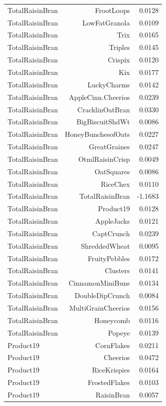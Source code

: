 \begin{longtable}{@{}lrr@{}}
TotalRaisinBran & FrootLoops & 0.0128 \\
TotalRaisinBran & LowFatGranola & 0.0109 \\
TotalRaisinBran & Trix & 0.0165 \\
TotalRaisinBran & Triples & 0.0145 \\
TotalRaisinBran & Crispix & 0.0120 \\
TotalRaisinBran & Kix & 0.0177 \\
TotalRaisinBran & LuckyCharms & 0.0142 \\
TotalRaisinBran & AppleCinn.Cheerios & 0.0239 \\
TotalRaisinBran & CracklinOatBran & 0.0330 \\
TotalRaisinBran & BigBiscuitShdWt & 0.0086 \\
TotalRaisinBran & HoneyBunchesofOats & 0.0227 \\
TotalRaisinBran & GreatGraines & 0.0247 \\
TotalRaisinBran & OtmlRaisinCrisp & 0.0049 \\
TotalRaisinBran & OatSquares & 0.0086 \\
TotalRaisinBran & RiceChex & 0.0110 \\
TotalRaisinBran & TotalRaisinBran & -1.1683 \\
TotalRaisinBran & Product19 & 0.0128 \\
TotalRaisinBran & AppleJacks & 0.0121 \\
TotalRaisinBran & CaptCrunch & 0.0239 \\
TotalRaisinBran & ShreddedWheat & 0.0095 \\
TotalRaisinBran & FruityPebbles & 0.0172 \\
TotalRaisinBran & Clusters & 0.0141 \\
TotalRaisinBran & CinnamonMiniBuns & 0.0134 \\
TotalRaisinBran & DoubleDipCrunch & 0.0084 \\
TotalRaisinBran & MultiGrainCheerios & 0.0156 \\
TotalRaisinBran & Honeycomb & 0.0116 \\
TotalRaisinBran & Popeye & 0.0139 \\
Product19 & CornFlakes & 0.0211 \\
Product19 & Cheerios & 0.0472 \\
Product19 & RiceKrispies & 0.0164 \\
Product19 & FrostedFlakes & 0.0103 \\
Product19 & RaisinBran & 0.0057 \\

\end{longtable}
